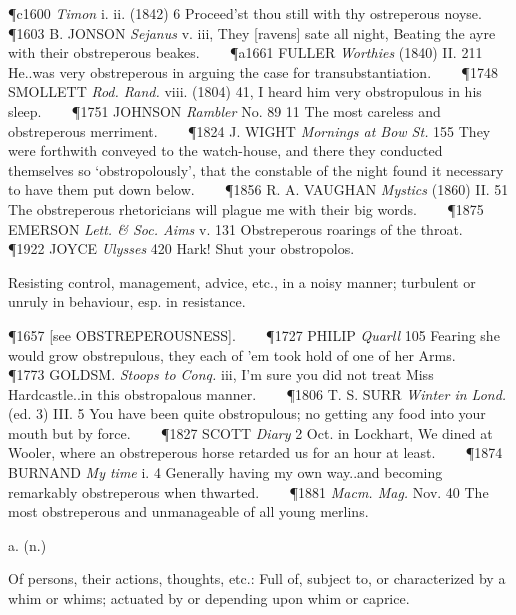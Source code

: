\begin{description}[wide, labelwidth=!, labelindent=0pt]
\begin{myenumerate}
\P c1600 \textit{Timon} i. ii. (1842) 6 Proceed'st thou still with thy ostreperous noyse.    
\P 1603 B. JONSON  \textit{Sejanus} v. iii, They [ravens] sate all night, Beating the ayre with their obstreperous beakes.    
\P a1661 FULLER  \textit{Worthies} (1840) II. 211 He..was very obstreperous in arguing the case for transubstantiation.    
\P 1748 SMOLLETT  \textit{Rod. Rand.} viii. (1804) 41, I heard him very obstropulous in his sleep.    
\P 1751 JOHNSON  \textit{Rambler} No. 89 11 The most careless and obstreperous merriment.    
\P 1824 J. WIGHT  \textit{Mornings at Bow St.} 155 They were forthwith conveyed to the watch-house, and there they conducted themselves so ‘obstropolously’, that the constable of the night found it necessary to have them put down below.    
\P 1856 R. A. VAUGHAN  \textit{Mystics} (1860) II. 51 The obstreperous rhetoricians will plague me with their big words.    
\P 1875 EMERSON  \textit{Lett. \& Soc. Aims} v. 131 Obstreperous roarings of the throat.    
\P 1922 JOYCE  \textit{Ulysses} 420 Hark! Shut your obstropolos.

 Resisting control, management, advice, etc., in a noisy manner; turbulent or unruly in behaviour, esp. in resistance.

\P 1657 [see OBSTREPEROUSNESS].    
\P 1727 PHILIP  \textit{Quarll} 105 Fearing she would grow obstrepulous, they each of 'em took hold of one of her Arms.    
\P 1773 GOLDSM.  \textit{Stoops to Conq.} iii, I'm sure you did not treat Miss Hardcastle..in this obstropalous manner.    
\P 1806 T. S. SURR  \textit{Winter in Lond.} (ed. 3) III. 5 You have been quite obstropulous; no getting any food into your mouth but by force.    
\P 1827 SCOTT  \textit{Diary} 2 Oct. in Lockhart, We dined at Wooler, where an obstreperous horse retarded us for an hour at least.    
\P 1874 BURNAND  \textit{My time} i. 4 Generally having my own way..and becoming remarkably obstreperous when thwarted.    
\P 1881 \textit{Macm.  Mag.} Nov. 40 The most obstreperous and unmanageable of all young merlins.
\end{myenumerate}

 a. (n.)

\noindent {}

\vspace{-0.3cm}

\begin{myenumerate}

 Of persons, their actions, thoughts, etc.: Full of, subject to, or characterized by a whim or whims; actuated by or depending upon whim or caprice.


\end{myenumerate}
\end{description}
